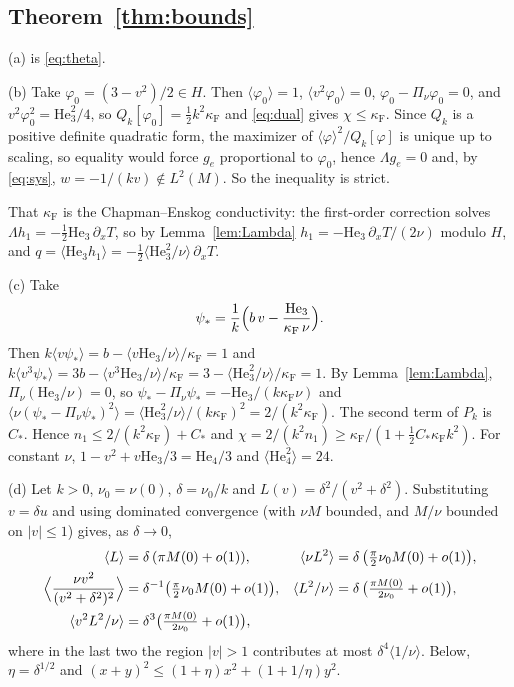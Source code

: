 \documentclass[11pt]{article}
\newcommand{\He}{\mathrm{He}}
\newcommand{\avg}[1]{\langle #1\rangle}
\theoremstyle{remark}
\begin{document}
\subsection{Theorem~\ref{thm:bounds}}

(a) is \eqref{eq:theta}.

(b) Take $\varphi_0 = (3-v^2)/2\in H$. Then $\avg{\varphi_0}=1$,
$\avg{v^2\varphi_0}=0$, $\varphi_0-\Pi_\nu\varphi_0=0$, and
$v^2\varphi_0^2 = \He_3^2/4$, so $Q_k[\varphi_0] = \tfrac12k^2\kappa_{\mathrm F}$
and \eqref{eq:dual} gives $\chi\le\kappa_{\mathrm F}$. Since $Q_k$ is a
positive definite quadratic form, the maximizer of
$\avg{\varphi}^2/Q_k[\varphi]$ is unique up to scaling, so equality would
force $g_e$ proportional to $\varphi_0$, hence $\Lambda g_e=0$ and, by
\eqref{eq:sys}, $w = -1/(kv)\notin L^2(M)$. So the inequality is strict.

That $\kappa_{\mathrm F}$ is the Chapman--Enskog conductivity: the
first-order correction solves $\Lambda h_1 = -\tfrac12\He_3\,\partial_xT$,
so by Lemma~\ref{lem:Lambda} $h_1 = -\He_3\,\partial_xT/(2\nu)$ modulo $H$,
and $q = \avg{\He_3h_1} = -\tfrac12\avg{\He_3^2/\nu}\,\partial_xT$.

(c) Take
\[
  \psi_* = \frac1k\Bigl(b\,v - \frac{\He_3}{\kappa_{\mathrm F}\,\nu}\Bigr).
\]
Then $k\avg{v\psi_*} = b - \avg{v\He_3/\nu}/\kappa_{\mathrm F} = 1$ and
$k\avg{v^3\psi_*} = 3b - \avg{v^3\He_3/\nu}/\kappa_{\mathrm F}
= 3 - \avg{\He_3^2/\nu}/\kappa_{\mathrm F} = 1$. By
Lemma~\ref{lem:Lambda}, $\Pi_\nu(\He_3/\nu) = 0$, so
$\psi_*-\Pi_\nu\psi_* = -\He_3/(k\kappa_{\mathrm F}\nu)$ and
$\avg{\nu(\psi_*-\Pi_\nu\psi_*)^2} = \avg{\He_3^2/\nu}/(k\kappa_{\mathrm F})^2
= 2/(k^2\kappa_{\mathrm F})$. The second term of $P_k$ is $C_*$. Hence
$n_1\le2/(k^2\kappa_{\mathrm F}) + C_*$ and
$\chi = 2/(k^2n_1)\ge\kappa_{\mathrm F}/(1+\tfrac12C_*\kappa_{\mathrm F}k^2)$.
For constant $\nu$, $1-v^2+v\He_3/3 = \He_4/3$ and $\avg{\He_4^2}=24$.

(d) Let $k>0$, $\nu_0=\nu(0)$, $\delta=\nu_0/k$ and
$L(v) = \delta^2/(v^2+\delta^2)$. Substituting $v=\delta u$ and using
dominated convergence (with $\nu M$ bounded, and $M/\nu$ bounded on
$|v|\le1$) gives, as $\delta\to0$,
\begin{align*}
  \avg{L} &= \delta\,(\pi M(0)+o(1)), &
  \avg{\nu L^2} &= \delta\,\bigl(\tfrac\pi2\nu_0M(0)+o(1)\bigr),\\
  \Bigl\langle\frac{\nu v^2}{(v^2+\delta^2)^2}\Bigr\rangle
     &= \delta^{-1}\bigl(\tfrac\pi2\nu_0M(0)+o(1)\bigr), &
  \avg{L^2/\nu} &= \delta\,\bigl(\tfrac{\pi M(0)}{2\nu_0}+o(1)\bigr),\\
  \avg{v^2L^2/\nu} &= \delta^3\bigl(\tfrac{\pi M(0)}{2\nu_0}+o(1)\bigr),
\end{align*}
where in the last two the region $|v|>1$ contributes at most
$\delta^4\avg{1/\nu}$. Below, $\eta = \delta^{1/2}$ and
$(x+y)^2\le(1+\eta)x^2+(1+1/\eta)y^2$.
\end{document}
